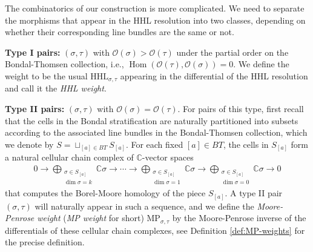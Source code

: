 \documentclass[11pt,reqno]{amsart}
\def\C {{\mathbb C}}
\theoremstyle{definition}
\numberwithin{equation}{section}
\begin{document}
\smallskip

The combinatorics of our construction is more complicated. We need to separate the morphisms that appear in the HHL resolution into two classes, depending on whether their corresponding line bundles are the same or not.

\smallskip

{\bf Type I pairs:} $(\sigma,\tau)$ with $\mathcal{O}(\sigma) > \mathcal{O}(\tau)$ under the partial order on the Bondal-Thomsen collection, i.e., $\operatorname{Hom}(\mathcal{O}(\tau), \mathcal{O}(\sigma))=0$. We define the weight to be the usual $\mathrm{HHL}_{\sigma,\tau}$ appearing in the differential of the HHL resolution and call it the \textit{HHL weight}. 

\smallskip

{\bf Type II pairs:} $(\sigma,\tau)$ with $\mathcal{O}(\sigma) = \mathcal{O}(\tau)$. For pairs of this type, first recall that the cells in the Bondal stratification are naturally partitioned into subsets according to the associated line bundles in the Bondal-Thomsen collection, which we denote by $S=\sqcup_{[a]\in BT}S_{[a]}$. For each fixed $[a]\in BT$, the cells in $S_{[a]}$ form a natural cellular chain complex of $\C$-vector spaces
\begin{align}\label{eq:BMcomplex-in-introduction}
    0\rightarrow \bigoplus_{\substack{\sigma\in S_{[a]} \\ \dim\sigma = k}}\C\sigma \rightarrow \cdots \rightarrow \bigoplus_{\substack{\sigma\in S_{[a]} \\ \dim\sigma = 1}}\C\sigma \rightarrow \bigoplus_{\substack{\sigma\in S_{[a]} \\ \dim\sigma = 0}}\C\sigma \rightarrow 0
\end{align}
that computes the Borel-Moore homology of the piece $S_{[a]}$. A type II pair $(\sigma,\tau)$ will naturally appear in such a sequence, and we define the \textit{Moore-Penrose weight} (\textit{MP weight} for short) $\mathrm{MP}_{\sigma,\tau}$ by the Moore-Penrose inverse of the differentials of these cellular chain complexes, see Definition \ref{def:MP-weights} for the precise definition.


\medskip
\end{document}
